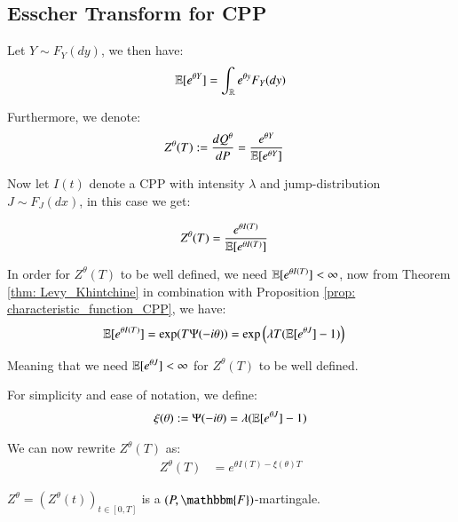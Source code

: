 \newpage 


\subsection{Esscher Transform for CPP}
Let $Y\sim F_{Y}(dy)$, we then have: 
\[
\mathbb{E}[e^{\theta Y}] = \int_{\mathbb{R}}e^{\theta y}F_{Y}(dy)
\]

Furthermore, we denote: 
\begin{align*}
Z^{\theta}(T) &:= \frac{dQ^{\theta}}{dP} = \frac{e^{\theta Y}}{\mathbb{E}[e^{\theta Y}]}   
\end{align*} 

Now let $I(t)$ denote a CPP with intensity $\lambda$ and jump-distribution $J \sim F_{J}(dx)$, in this case we get: 

\begin{align*}
Z^{\theta}(T) &= \frac{
e^{\theta I(T)}
}{
\mathbb{E}[e^{\theta I(T)}]
}    
\end{align*} 

In order for $Z^{\theta}(T)$ to be well defined, we need $\mathbb{E}[e^{\theta I(T)}] < \infty $, now from Theorem \ref{thm: Levy_Khintchine} in combination with Proposition \ref{prop: characteristic_function_CPP}, we have:
\begin{align*}
\mathbb{E}[e^{\theta I(T)}] &= \exp(T\Psi(-i\theta))  
= 
\exp\left(
\lambda T(\mathbb{E}[e^{\theta J}] -1)
\right)
\end{align*} 

Meaning that we need $\mathbb{E}[e^{\theta J}] < \infty $ for $Z^{\theta}(T)$ to be well defined. 

\begin{notation}
For simplicity and ease of notation, we define: 
\begin{align*}
\xi(\theta) := \Psi(-i\theta) = \lambda(\mathbb{E}[e^{\theta J}] -1)  
\end{align*}
\end{notation}

We can now rewrite $Z^{\theta}(T)$ as: 
\begin{align*}
Z^{\theta}(T) &= e^{\theta I(T) - \xi(\theta)T}    
\end{align*}

\begin{proposition}
$Z^{\theta} = (Z^{\theta}(t))_{t\in [0,T]}$ is a $(P, \mathbbm{F})$-martingale.     
\end{proposition}


